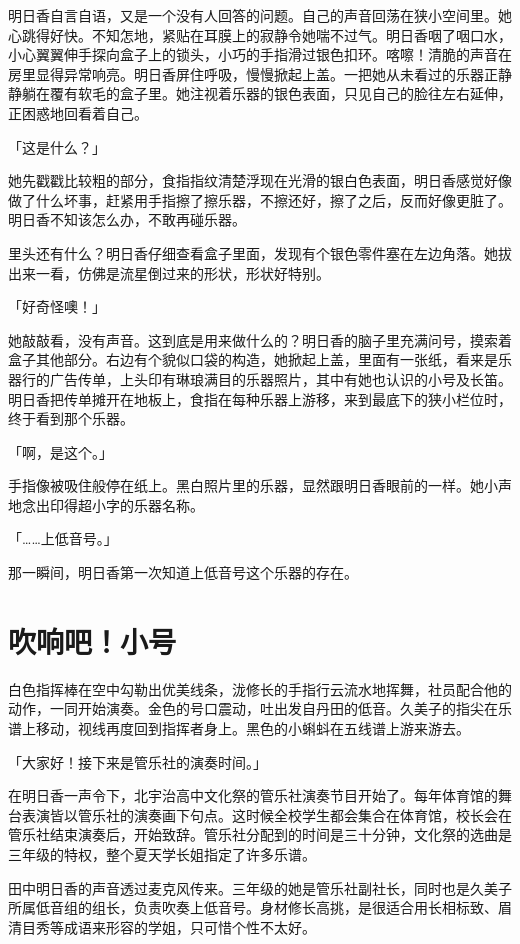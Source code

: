 \documentclass[UTF8]{ctexart}
\begin{document}
    明日香自言自语，又是一个没有人回答的问题。自己的声音回荡在狭小空间里。她心跳得好快。不知怎地，紧贴在耳膜上的寂静令她喘不过气。明日香咽了咽口水，小心翼翼伸手探向盒子上的锁头，小巧的手指滑过银色扣环。喀嚓！清脆的声音在房里显得异常响亮。明日香屏住呼吸，慢慢掀起上盖。一把她从未看过的乐器正静静躺在覆有软毛的盒子里。她注视着乐器的银色表面，只见自己的脸往左右延伸，正困惑地回看着自己。 

    「这是什么？」 

    她先戳戳比较粗的部分，食指指纹清楚浮现在光滑的银白色表面，明日香感觉好像做了什么坏事，赶紧用手指擦了擦乐器，不擦还好，擦了之后，反而好像更脏了。明日香不知该怎么办，不敢再碰乐器。 

    里头还有什么？明日香仔细查看盒子里面，发现有个银色零件塞在左边角落。她拔出来一看，仿佛是流星倒过来的形状，形状好特别。 

    「好奇怪噢！」 

    她敲敲看，没有声音。这到底是用来做什么的？明日香的脑子里充满问号，摸索着盒子其他部分。右边有个貌似口袋的构造，她掀起上盖，里面有一张纸，看来是乐器行的广告传单，上头印有琳琅满目的乐器照片，其中有她也认识的小号及长笛。明日香把传单摊开在地板上，食指在每种乐器上游移，来到最底下的狭小栏位时，终于看到那个乐器。 

    「啊，是这个。」 

    手指像被吸住般停在纸上。黑白照片里的乐器，显然跟明日香眼前的一样。她小声地念出印得超小字的乐器名称。 

    「……上低音号。」 

    那一瞬间，明日香第一次知道上低音号这个乐器的存在。   

    \setcounter{secnumdepth}{3}
    \section{吹响吧！小号}
    白色指挥棒在空中勾勒出优美线条，泷修长的手指行云流水地挥舞，社员配合他的动作，一同开始演奏。金色的号口震动，吐出发自丹田的低音。久美子的指尖在乐谱上移动，视线再度回到指挥者身上。黑色的小蝌蚪在五线谱上游来游去。 

    「大家好！接下来是管乐社的演奏时间。」 

    在明日香一声令下，北宇治高中文化祭的管乐社演奏节目开始了。每年体育馆的舞台表演皆以管乐社的演奏画下句点。这时候全校学生都会集合在体育馆，校长会在管乐社结束演奏后，开始致辞。管乐社分配到的时间是三十分钟，文化祭的选曲是三年级的特权，整个夏天学长姐指定了许多乐谱。 

    田中明日香的声音透过麦克风传来。三年级的她是管乐社副社长，同时也是久美子所属低音组的组长，负责吹奏上低音号。身材修长高挑，是很适合用长相标致、眉清目秀等成语来形容的学姐，只可惜个性不太好。 
\end{document}
